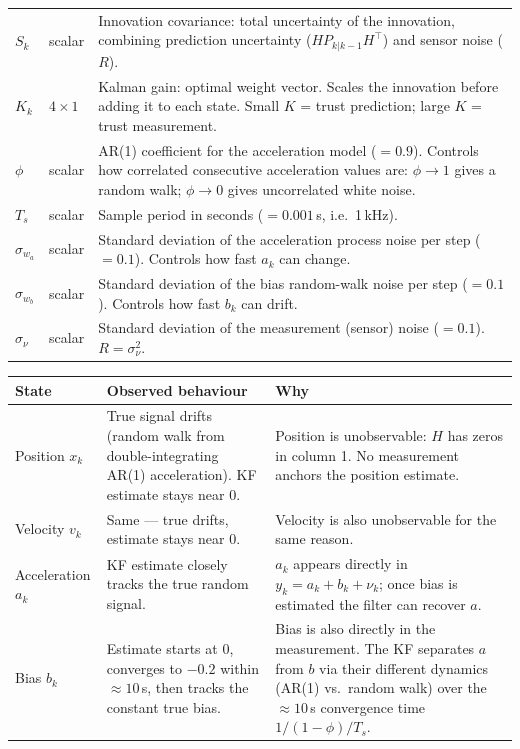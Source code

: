 \documentclass[12pt, a4paper]{article}
\begin{document}
\begin{center}
\begin{tabular}{p{2.8cm} p{2.0cm} p{8.5cm}}
  $S_k$
    & scalar
    & Innovation covariance: total uncertainty of the innovation,
      combining prediction uncertainty ($HP_{k|k-1}H^\top$) and
      sensor noise ($R$). \\
  $K_k$
    & $4 \times 1$
    & Kalman gain: optimal weight vector.
      Scales the innovation before adding it to each state.
      Small $K$ = trust prediction; large $K$ = trust measurement. \\
  $\phi$
    & scalar
    & AR(1) coefficient for the acceleration model ($= 0.9$).
      Controls how correlated consecutive acceleration values are:
      $\phi \to 1$ gives a random walk;
      $\phi \to 0$ gives uncorrelated white noise. \\
  $T_s$
    & scalar
    & Sample period in seconds ($= 0.001$\,s, i.e.\ 1\,kHz). \\
  $\sigma_{w_a}$
    & scalar
    & Standard deviation of the acceleration process noise per step
      ($= 0.1$). Controls how fast $a_k$ can change. \\
  $\sigma_{w_b}$
    & scalar
    & Standard deviation of the bias random-walk noise per step
      ($= 0.1$). Controls how fast $b_k$ can drift. \\
  $\sigma_\nu$
    & scalar
    & Standard deviation of the measurement (sensor) noise ($= 0.1$).
      $R = \sigma_\nu^2$. \\
  \bottomrule
\end{tabular}
\end{center}
\clearpage
\begin{center}
\renewcommand{\arraystretch}{1.6}
\begin{tabular}{p{2.2cm} p{6cm} p{5.5cm}}
  \toprule
  \textbf{State} & \textbf{Observed behaviour} & \textbf{Why} \\
  \midrule
  Position $x_k$ &
    True signal drifts (random walk from double-integrating AR(1)
    acceleration).
    KF estimate stays near 0. &
    Position is unobservable: $H$ has zeros in column 1.
    No measurement anchors the position estimate. \\
  Velocity $v_k$ &
    Same --- true drifts, estimate stays near 0. &
    Velocity is also unobservable for the same reason. \\
  Acceleration $a_k$ &
    KF estimate closely tracks the true random signal. &
    $a_k$ appears directly in $y_k = a_k + b_k + \nu_k$;
    once bias is estimated the filter can recover $a$. \\
  Bias $b_k$ &
    Estimate starts at 0, converges to $-0.2$ within
    $\approx 10$\,s, then tracks the constant true bias. &
    Bias is also directly in the measurement.
    The KF separates $a$ from $b$ via their different dynamics
    (AR(1) vs.\ random walk) over the $\approx 10$\,s convergence
    time $1/(1-\phi)/T_s$. \\
  \bottomrule
\end{tabular}
\end{center}
\end{document}

